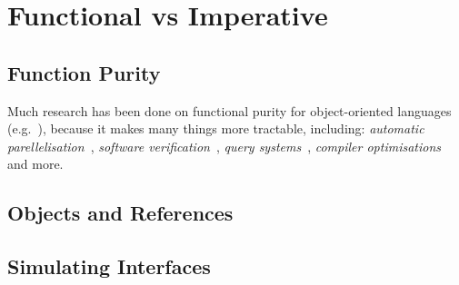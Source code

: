 \newpage
\section{Functional vs Imperative}



\subsection{Function Purity}
Much research has been done on functional purity for object-oriented
languages (e.g.~\cite{Pea11,Rou04,SR05,MRR02}), because it makes 
many things more tractable, including: {\em automatic
 parellelisation}~\cite{ABCR10,CRPAHBW10}, {\em software
 verification}~\cite{Leav02,BNSS04,BA05,DL07}, {\em query
 systems}~\cite{LHS97,WPN08}, {\em compiler
 optimisations}~\cite{Cla97,LLH05,ZRKW08} and more.

\subsection{Objects and References}
\subsection{Simulating Interfaces}